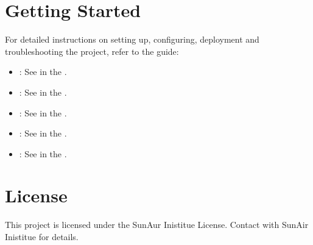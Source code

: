 \documentclass[a4paper,10pt,english]{sphinxmanual}
\begin{document}
\section{Getting Started}
\label{\detokenize{overview:getting-started}}
\sphinxAtStartPar
For detailed instructions on setting up, configuring, deployment and troubleshooting the project, refer to the  guide:
\begin{itemize}
\item {} 
\sphinxAtStartPar
{}: See {\hyperref[\detokenize{quickstart:prerequisites}]{}} in the {\hyperref[\detokenize{quickstart::doc}]{}}.

\item {} 
\sphinxAtStartPar
{}: See {\hyperref[\detokenize{quickstart:setting-up-environment}]{}} in the {\hyperref[\detokenize{quickstart::doc}]{}}.

\item {} 
\sphinxAtStartPar
{}: See {\hyperref[\detokenize{quickstart:configuration}]{}} in the {\hyperref[\detokenize{quickstart::doc}]{}}.

\item {} 
\sphinxAtStartPar
{}: See {\hyperref[\detokenize{quickstart:deployment}]{}} in the {\hyperref[\detokenize{quickstart::doc}]{}}.

\item {} 
\sphinxAtStartPar
{}: See {\hyperref[\detokenize{quickstart:troubleshooting}]{}} in the {\hyperref[\detokenize{quickstart::doc}]{}}.

\end{itemize}


\section{License}
\label{\detokenize{overview:license}}
\sphinxAtStartPar
This project is licensed under the SunAur Inistitue License. Contact with SunAir Inistitue for details.
\end{document}
